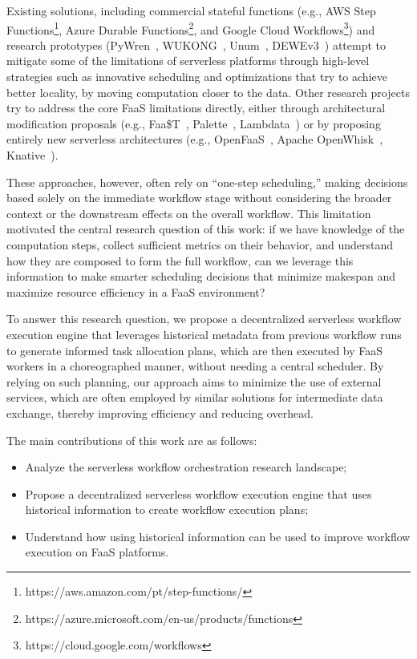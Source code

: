\documentclass[conference]{IEEEtran}
\begin{document}
Existing solutions, including commercial stateful functions (e.g., AWS Step Functions\footnote{https://aws.amazon.com/pt/step-functions/}, Azure Durable Functions\footnote{https://azure.microsoft.com/en-us/products/functions}, and Google Cloud Workflows\footnote{https://cloud.google.com/workflows}) and research prototypes (PyWren~\cite{pywren}, WUKONG~\cite{wukong_2}, Unum~\cite{unum_decentralized_orchestrator}, DEWEv3~\cite{dewe_v3}) attempt to mitigate some of the limitations of serverless platforms through high-level strategies such as innovative scheduling and optimizations that try to achieve better locality, by moving computation closer to the data. Other research projects try to address the core FaaS limitations directly, either through architectural modification proposals (e.g., Faa\$T~\cite{faast_caching}, Palette~\cite{palette_load_balancing}, Lambdata~\cite{lambdata_intents}) or by proposing entirely new serverless architectures (e.g., OpenFaaS~\cite{openfaas}, Apache OpenWhisk~\cite{open_whisk}, Knative~\cite{knative}).

These approaches, however, often rely on “one-step scheduling,” making decisions based solely on the immediate workflow stage without considering the broader context or the downstream effects on the overall workflow. This limitation motivated the central research question of this work: if we have knowledge of the computation steps, collect sufficient metrics on their behavior, and understand how they are composed to form the full workflow, can we leverage this information to make smarter scheduling decisions that minimize makespan and maximize resource efficiency in a FaaS environment?

To answer this research question, we propose a decentralized serverless workflow execution engine that leverages historical metadata from previous workflow runs to generate informed task allocation plans, which are then executed by FaaS workers in a choreographed manner, without needing a central scheduler. By relying on such planning, our approach aims to minimize the use of external services, which are often employed by similar solutions for intermediate data exchange, thereby improving efficiency and reducing overhead.

The main contributions of this work are as follows:
\begin{itemize}
    \item Analyze the serverless workflow orchestration research landscape;
    \item Propose a decentralized serverless workflow execution engine that uses historical information to create workflow execution plans;
    \item Understand how using historical information can be used to improve workflow execution on FaaS platforms.
\end{itemize}
\end{document}
